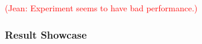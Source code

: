 


\textcolor{red}{(Jean: Experiment seems to have bad performance.)}

\subsubsection{Result Showcase}









